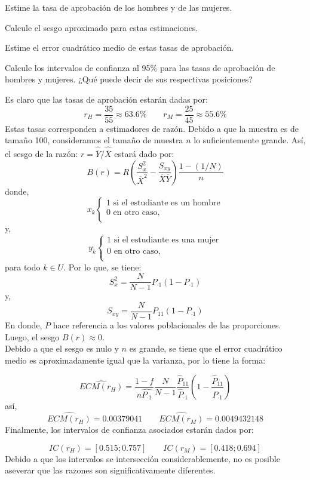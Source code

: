 \noaddpoints
\begin{parts}
\item Estime la tasa de aprobación de los hombres y de las mujeres.
\item Calcule el sesgo aproximado para estas estimaciones.
\item Estime el error cuadrático medio de estas tasas de aprobación.
\item Calcule los intervalos de confianza al 95\% para las tasas de aprobación de hombres y mujeres. ¿Qué puede decir de sus respectivas posiciones?
\end{parts}
\begin{solution}
Es claro que las tasas de aprobación estarán dadas por:
$$r_H=\dfrac{35}{55}\approx 63.6\% \quad \quad r_M=\dfrac{25}{45}\approx 55.6\%$$
Estas tasas corresponden a estimadores de razón. Debido a que la muestra es de tamaño 100, consideramos el tamaño de muestra $n$ lo suficientemente grande. Así, el sesgo de la razón: $r=\widehat{\overline{Y}}/\widehat{\overline{X}}$ estará dado por:
$$B(r)=R\left(\dfrac{S_{x}^2}{\overline{X}^2}-\dfrac{S_{xy}}{\overline{X}\overline{Y}} \right)\dfrac{1-(1/N)}{n}$$
donde,
$$x_k \begin{cases} 
1 \text{ si el estudiante es un hombre}\\
0 \text{ en otro caso,}\\
\end{cases}
$$
y,
$$y_k \begin{cases} 
1 \text{ si el estudiante es una mujer}\\
0 \text{ en otro caso,}\\
\end{cases}
$$
para todo $k\in U$. Por lo que, se tiene:
$$S_{x}^{2}=\dfrac{N}{N-1}P_{\cdot 1} (1-P_{\cdot 1})$$
y,
$$S_{xy}=\dfrac{N}{N-1}P_{11} (1-P_{\cdot 1})$$
En donde, $P$ hace referencia a los valores poblacionales de las proporciones. Luego, el sesgo $B(r)\approx 0$.\\

Debido a que el sesgo es nulo y $n$ es grande, se tiene que el error cuadrático medio es aproximadamente igual que la varianza, por lo tiene la forma:

$$\widehat{ECM(r_H)}=\dfrac{1-f}{n\hat{P_{\cdot 1}}}\dfrac{N}{N-1} \dfrac{\hat{P}_{11}}{\hat{P}_{\cdot 1}}\left(1- \dfrac{\hat{P}_{11}}{\hat{P}_{\cdot 1}}\right)$$
así,
$$\widehat{ECM(r_H)}=0.00379041 \quad \quad \widehat{ECM(r_M)}=0.0049432148$$
Finalmente, los intervalos de confianza asociados estarán dados por:

$$IC(r_H)=\left[ 0.515;0.757\right] \quad \quad IC(r_M)=\left[ 0.418;0.694\right]$$
Debido a que los intervalos se intersección considerablemente, no es posible aseverar que las razones son significativamente diferentes.
\end{solution}